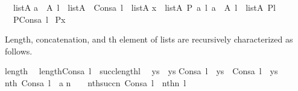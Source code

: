 \begin{isabelle}%
{\isacharbrackleft}{\kern0pt}{\isacharbrackright}{\kern0pt}\ {\isasymin}\ list{\isacharparenleft}{\kern0pt}A{\isacharparenright}{\kern0pt}\isasep\isanewline%
{\isasymlbrakk}a\ {\isasymin}\ A{\isacharsemicolon}{\kern0pt}\ l\ {\isasymin}\ list{\isacharparenleft}{\kern0pt}A{\isacharparenright}{\kern0pt}{\isasymrbrakk}\ {\isasymLongrightarrow}\ Cons{\isacharparenleft}{\kern0pt}a{\isacharcomma}{\kern0pt}\ l{\isacharparenright}{\kern0pt}\ {\isasymin}\ list{\isacharparenleft}{\kern0pt}A{\isacharparenright}{\kern0pt}\isasep\isanewline\isanewline%
{\isasymlbrakk}x\ {\isasymin}\ list{\isacharparenleft}{\kern0pt}A{\isacharparenright}{\kern0pt}{\isacharsemicolon}{\kern0pt}\ P{\isacharparenleft}{\kern0pt}{\isacharbrackleft}{\kern0pt}{\isacharbrackright}{\kern0pt}{\isacharparenright}{\kern0pt}{\isacharsemicolon}{\kern0pt}\ {\isasymAnd}a\ l{\isachardot}{\kern0pt}\ {\isasymlbrakk}a\ {\isasymin}\ A{\isacharsemicolon}{\kern0pt}\ l\ {\isasymin}\ list{\isacharparenleft}{\kern0pt}A{\isacharparenright}{\kern0pt}{\isacharsemicolon}{\kern0pt}\ P{\isacharparenleft}{\kern0pt}l{\isacharparenright}{\kern0pt}{\isasymrbrakk}\ {\isasymLongrightarrow}\isanewline
\ \ P{\isacharparenleft}{\kern0pt}Cons{\isacharparenleft}{\kern0pt}a{\isacharcomma}{\kern0pt}\ l{\isacharparenright}{\kern0pt}{\isacharparenright}{\kern0pt}{\isasymrbrakk}
{\isasymLongrightarrow}\ P{\isacharparenleft}{\kern0pt}x{\isacharparenright}{\kern0pt}%
\end{isabelle}%
Length, concatenation, and th element of lists are
recursively characterized as follows.%
\begin{isabelle}%
length{\isacharparenleft}{\kern0pt}{\isacharbrackleft}{\kern0pt}{\isacharbrackright}{\kern0pt}{\isacharparenright}{\kern0pt}\ {\isacharequal}{\kern0pt}\ {}\isasep\isanewline%
length{\isacharparenleft}{\kern0pt}Cons{\isacharparenleft}{\kern0pt}a{\isacharcomma}{\kern0pt}\ l{\isacharparenright}{\kern0pt}{\isacharparenright}{\kern0pt}\ {\isacharequal}{\kern0pt}\ succ{\isacharparenleft}{\kern0pt}length{\isacharparenleft}{\kern0pt}l{\isacharparenright}{\kern0pt}{\isacharparenright}{\kern0pt}\isasep\isanewline\isanewline%
{\isacharbrackleft}{\kern0pt}{\isacharbrackright}{\kern0pt}\ {\isacharat}{\kern0pt}\ ys\ {\isacharequal}{\kern0pt}\ ys\isasep\isanewline%
Cons{\isacharparenleft}{\kern0pt}a{\isacharcomma}{\kern0pt}\ l{\isacharparenright}{\kern0pt}\ {\isacharat}{\kern0pt}\ ys\ {\isacharequal}{\kern0pt}\ Cons{\isacharparenleft}{\kern0pt}a{\isacharcomma}{\kern0pt}\ l\ {\isacharat}{\kern0pt}\ ys{\isacharparenright}{\kern0pt}\isasep\isanewline\isanewline%
nth{\isacharparenleft}{\kern0pt}{}{\isacharcomma}{\kern0pt}\ Cons{\isacharparenleft}{\kern0pt}a{\isacharcomma}{\kern0pt}\ l{\isacharparenright}{\kern0pt}{\isacharparenright}{\kern0pt}\ {\isacharequal}{\kern0pt}\ a\isasep\isanewline%
n\ {\isasymin}\ {\isasymomega}\ {\isasymLongrightarrow}\ nth{\isacharparenleft}{\kern0pt}succ{\isacharparenleft}{\kern0pt}n{\isacharparenright}{\kern0pt}{\isacharcomma}{\kern0pt}\ Cons{\isacharparenleft}{\kern0pt}a{\isacharcomma}{\kern0pt}\ l{\isacharparenright}{\kern0pt}{\isacharparenright}{\kern0pt}\ {\isacharequal}{\kern0pt}\ nth{\isacharparenleft}{\kern0pt}n{\isacharcomma}{\kern0pt}\ l{\isacharparenright}{\kern0pt}%
\end{isabelle}%
